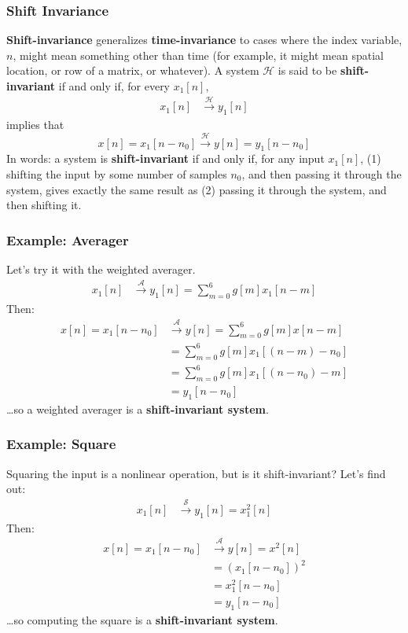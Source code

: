 \documentclass{beamer}
\begin{document}
\begin{frame}
  \frametitle{Shift Invariance}

  {\bf Shift-invariance} generalizes {\bf time-invariance} to cases
  where the index variable, $n$, might mean something other than time
  (for example, it might mean spatial location, or row of a matrix, or
  whatever).  A system ${\mathcal H}$ is said to be {\bf
    shift-invariant} if and only if, for every $x_1[n]$,
  \begin{align*}
    x_1[n] &\stackrel{\mathcal H}{\longrightarrow} y_1[n]
  \end{align*}
  implies that
  \[
  x[n]=x_1[n-n_0] \stackrel{\mathcal H}{\longrightarrow} y[n]=y_1[n-n_0]
  \]
  In words: a system is {\bf shift-invariant} if and only if, for any
  input $x_1[n]$, (1) shifting the input by some number of samples
  $n_0$, and then passing it through the system, gives exactly the
  same result as (2) passing it through the system, and then shifting
  it.
\end{frame}

\begin{frame}
  \frametitle{Example: Averager}

  Let's try it with the weighted averager.
  \begin{align*}
  x_1[n] &\stackrel{\mathcal A}{\longrightarrow} y_1[n]=\sum_{m=0}^6 g[m] x_1[n-m]
  \end{align*}
  Then:
  \begin{align*}
    x[n]=x_1[n-n_0] &\stackrel{\mathcal A}{\longrightarrow} y[n]=\sum_{m=0}^6 g[m] x[n-m]\\
    &=\sum_{m=0}^6 g[m] x_1\left[(n-m)-n_0\right]\\
    &=\sum_{m=0}^6 g[m] x_1\left[(n-n_0)-m\right]\\
    &=y_1[n-n_0]
  \end{align*}
  \ldots so a weighted averager is a {\bf shift-invariant system}.
\end{frame}

\begin{frame}
  \frametitle{Example: Square}

  Squaring the input is a nonlinear operation, but is it shift-invariant?
  Let's find out:
  \begin{align*}
  x_1[n] &\stackrel{\mathcal S}{\longrightarrow} y_1[n]=x_1^2[n]
  \end{align*}
  Then:
  \begin{align*}
    x[n]=x_1[n-n_0] &\stackrel{\mathcal A}{\longrightarrow} y[n]=x^2[n]\\
    &= \left(x_1[n-n_0]\right)^2\\
    &= x_1^2[n-n_0]\\
    &=y_1[n-n_0]
  \end{align*}
  \ldots so computing the square is a {\bf shift-invariant system}.
\end{frame}
\end{document}
